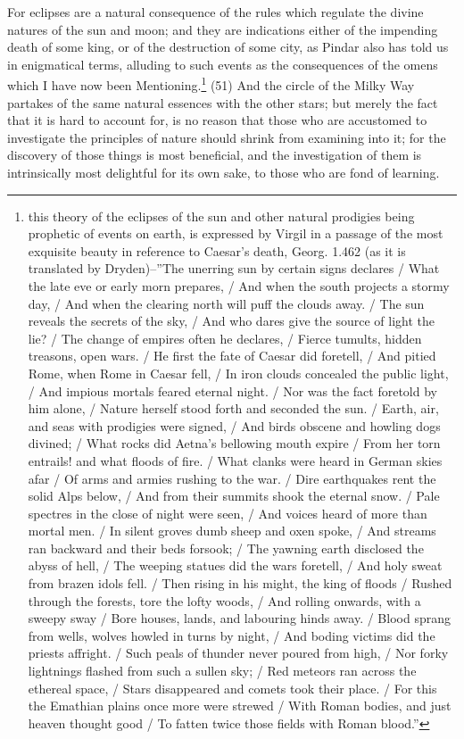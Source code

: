 For eclipses are a natural consequence of the rules which regulate the divine natures of the sun
and moon; and they are indications either of the impending death of some king, or of the
destruction of some city, as Pindar also has told us in enigmatical terms, alluding to such events as
the consequences of the omens which I have now been Mentioning.\footnote{this theory of the eclipses of the
sun and other natural prodigies being prophetic of events on earth, is expressed by Virgil in a passage of the most
exquisite beauty in reference to Caesar's death, Georg. 1.462 (as it is translated by Dryden)--''The unerring sun by certain
signs declares / What the late eve or early morn prepares, / And when the south projects a stormy day, / And when the
clearing north will puff the clouds away. / The sun reveals the secrets of the sky, / And who dares give the source of light
the lie? / The change of empires often he declares, / Fierce tumults, hidden treasons, open wars. / He first the fate of
Caesar did foretell, / And pitied Rome, when Rome in Caesar fell, / In iron clouds concealed the public light, / And
impious mortals feared eternal night. / Nor was the fact foretold by him alone, / Nature herself stood forth and seconded
the sun. / Earth, air, and seas with prodigies were signed, / And birds obscene and howling dogs divined; / What rocks did
Aetna's bellowing mouth expire / From her torn entrails! and what floods of fire. / What clanks were heard in German skies
afar / Of arms and armies rushing to the war. / Dire earthquakes rent the solid Alps below, / And from their summits shook
the eternal snow. / Pale spectres in the close of night were seen, / And voices heard of more than mortal men. / In silent
groves dumb sheep and oxen spoke, / And streams ran backward and their beds forsook; / The yawning earth disclosed
the abyss of hell, / The weeping statues did the wars foretell, / And holy sweat from brazen idols fell. / Then rising in his
might, the king of floods / Rushed through the forests, tore the lofty woods, / And rolling onwards, with a sweepy sway /
Bore houses, lands, and labouring hinds away. / Blood sprang from wells, wolves howled in turns by night, / And boding
victims did the priests affright. / Such peals of thunder never poured from high, / Nor forky lightnings flashed from such a
sullen sky; / Red meteors ran across the ethereal space, / Stars disappeared and comets took their place. / For this the
Emathian plains once more were strewed / With Roman bodies, and just heaven thought good / To fatten twice those
fields with Roman blood.''} (51) And the circle of the Milky Way partakes of the same natural essences
with the other stars; but merely the fact that it is hard to account for, is no reason that those who
are accustomed to investigate the principles of nature should shrink from examining into it; for the
discovery of those things is most beneficial, and the investigation of them is intrinsically most
delightful for its own sake, to those who are fond of learning.

